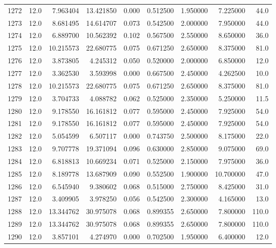 \begin{tabular}{lrrrrrrrr}
1272 &   12.0 &   7.963404 &  13.421850 &  0.000 &  0.512500 &  1.950000 &   7.225000 &   44.0 \\
1273 &   12.0 &   8.681495 &  14.614707 &  0.073 &  0.542500 &  2.000000 &   7.950000 &   44.0 \\
1274 &   12.0 &   6.889700 &  10.562392 &  0.102 &  0.567500 &  2.550000 &   8.650000 &   36.0 \\
1275 &   12.0 &  10.215573 &  22.680775 &  0.075 &  0.671250 &  2.650000 &   8.375000 &   81.0 \\
1276 &   12.0 &   3.873805 &   4.245312 &  0.050 &  0.520000 &  2.000000 &   6.850000 &   12.0 \\
1277 &   12.0 &   3.362530 &   3.593998 &  0.000 &  0.667500 &  2.450000 &   4.262500 &   10.0 \\
1278 &   12.0 &  10.215573 &  22.680775 &  0.075 &  0.671250 &  2.650000 &   8.375000 &   81.0 \\
1279 &   12.0 &   3.704733 &   4.088782 &  0.062 &  0.525000 &  2.350000 &   5.250000 &   11.5 \\
1280 &   12.0 &   9.178550 &  16.161812 &  0.077 &  0.595000 &  2.450000 &   7.925000 &   54.0 \\
1281 &   12.0 &   9.178550 &  16.161812 &  0.077 &  0.595000 &  2.450000 &   7.925000 &   54.0 \\
1282 &   12.0 &   5.054599 &   6.507117 &  0.000 &  0.743750 &  2.500000 &   8.175000 &   22.0 \\
1283 &   12.0 &   9.707778 &  19.371094 &  0.096 &  0.630000 &  2.850000 &   9.075000 &   69.0 \\
1284 &   12.0 &   6.818813 &  10.669234 &  0.071 &  0.525000 &  2.150000 &   7.975000 &   36.0 \\
1285 &   12.0 &   8.189778 &  13.687909 &  0.090 &  0.552500 &  1.900000 &  10.700000 &   47.0 \\
1286 &   12.0 &   6.545940 &   9.380602 &  0.068 &  0.515000 &  2.750000 &   8.425000 &   31.0 \\
1287 &   12.0 &   3.409905 &   3.978250 &  0.056 &  0.542500 &  2.300000 &   4.165000 &   13.0 \\
1288 &   12.0 &  13.344762 &  30.975078 &  0.068 &  0.899355 &  2.650000 &   7.800000 &  110.0 \\
1289 &   12.0 &  13.344762 &  30.975078 &  0.068 &  0.899355 &  2.650000 &   7.800000 &  110.0 \\
1290 &   12.0 &   3.857101 &   4.274970 &  0.000 &  0.702500 &  1.950000 &   6.400000 &   12.0 \\

\end{tabular}
